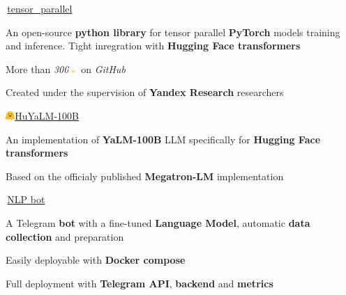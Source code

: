 
\begin{cventries}
  \cventry
    {} %
    {\,\faGithub\acvHeaderIconSep\href{https://github.com/BlackSamorez/tensor_parallel}{tensor\_parallel}} %
    {} %
    {} %
    {
      \begin{cvitems} %
        \item { An open-source \textbf{python library} for tensor parallel \textbf{PyTorch} models training and inference. Tight inregration with \textbf{Hugging Face transformers} }
        \item { More than \textit{300}\includegraphics[width=3.5mm]{image.png} on \textit{GitHub} }
        \item { Created under the supervision of \textbf{Yandex Research} researchers }
      \end{cvitems}
    }

  \cventry
    {} %
    {\includegraphics[width=3.5mm]{hf.jpg}\acvHeaderIconSep\href{https://huggingface.co/BlackSamorez/HuYaLM-100B-fp16}{HuYaLM-100B}} %
    {} %
    {} %
    {
      \begin{cvitems} %
        \item { An implementation of \textbf{YaLM-100B} LLM specifically for \textbf{Hugging Face transformers} }
        \item { Based on the officialy published \textbf{Megatron-LM} implementation }
      \end{cvitems}
    }
    
  \cventry
    {} %
    {\,\faGithub\acvHeaderIconSep\href{https://github.com/BlackSamorez/ebanko}{NLP bot}} %
    {} %
    {} %
    {
      \begin{cvitems} %
        \item {A Telegram \textbf{bot} with a fine-tuned \textbf{Language Model}, automatic \textbf{data collection} and preparation}
        \item {Easily deployable with \textbf{Docker compose}}
		\item {Full deployment with \textbf{Telegram API}, \textbf{backend} and \textbf{metrics}}
      \end{cvitems}
    }
    

\end{cventries}
